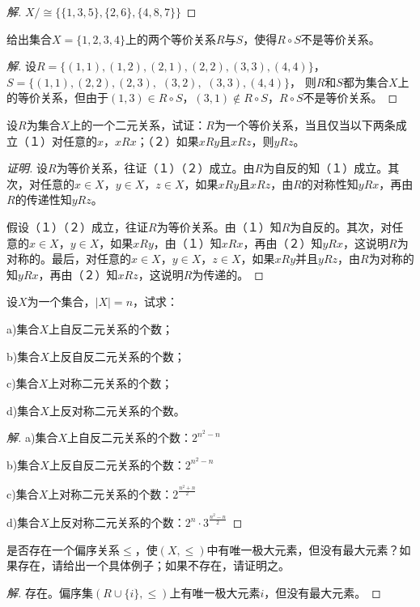 \documentclass{article}
\begin{document}
\begin{CJK}{UTF8}{gbsn}
\begin{proof}[解]
  $X/\cong \{\{1,3,5\},\{2,6\},\{4,8,7\}\}$

\end{proof}
\begin{Exercise}
 给出集合$X=\{1,2,3,4\}$上的两个等价关系$R$与$S$，使得$R\circ S$不是等价关系。
\end{Exercise}
\begin{proof}[解]
  设$R=\{(1,1),(1,2),(2,1),(2,2),(3,3),(4,4)\}$，$S=\{(1,1),(2,2),(2,3),$  $(3,2),$  $(3,3),(4,4)\}$， 
  则$R$和$S$都为集合$X$上的等价关系，但由于$(1,3)\in R\circ S$，$(3,1)\notin R\circ S$，$R\circ S$不是等价关系。
\end{proof}
\begin{Exercise}
  设$R$为集合$X$上的一个二元关系，试证：$R$为一个等价关系，当且仅当以下两条成立（１）对任意的$x$，$xRx$；（２）如果$xRy$且$xRz$，则$yRz$。
\end{Exercise}
\begin{proof}[证明]

  设$R$为等价关系，往证（１）（２）成立。由$R$为自反的知（１）成立。其次，对任意的$x\in X$，$y\in X$，$z\in X$，如果$xRy$且$xRz$，由$R$的对称性知$yRx$，再由$R$的传递性知$yRz$。

  假设（１）（２）成立，往证$R$为等价关系。由（１）知$R$为自反的。其次，对任意的$x\in X$，$y\in X$，如果$xRy$，由（１）知$xRx$，再由（２）知$yRx$，这说明$R$为对称的。最后，对任意的$x\in X$，$y\in X$，$z\in X$，如果$xRy$并且$yRz$，由$R$为对称的知$yRx$，再由（２）知$xRz$，这说明$R$为传递的。
  
\end{proof}


\begin{Exercise}
  设$X$为一个集合，$|X|=n$，试求：

  a)集合$X$上自反二元关系的个数；

  b)集合$X$上反自反二元关系的个数；

  c)集合$X$上对称二元关系的个数；

  d)集合$X$上反对称二元关系的个数。
\end{Exercise}
\begin{proof}[解]
  a)集合$X$上自反二元关系的个数：$2^{n^2-n}$

  b)集合$X$上反自反二元关系的个数：$2^{n^2-n}$

  c)集合$X$上对称二元关系的个数：$2^{\frac{n^2+n}{2}}$

  d)集合$X$上反对称二元关系的个数：$2^n\cdot 3^{\frac{n^2-n}{2}}$
\end{proof}
\begin{Exercise}
  是否存在一个偏序关系$\leq$，使$(X,\leq)$中有唯一极大元素，但没有最大元素？如果存在，请给出一个具体例子；如果不存在，请证明之。
\end{Exercise}
\begin{proof}[解]
  存在。偏序集$(R\cup \{i\},\leq)$上有唯一极大元素$i$，但没有最大元素。


\end{proof}
\end{CJK}
\end{document}
